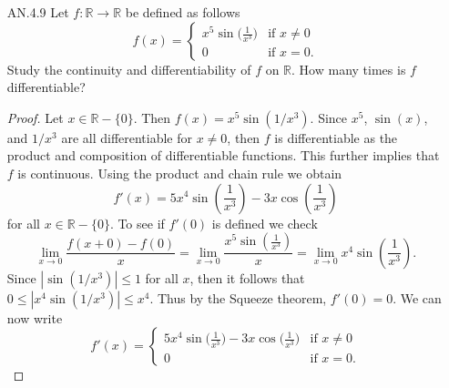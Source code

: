 \documentclass[12pt]{article}
\begin{document}
\begin{enumerate}
\begin{enumerate}[(a)]
\begin{proof}
                        Thus $y\mid x$. Therefore $x=y$. 
                    \end{proof}
            \end{enumerate}
        \item[AN.4.9] Let $f:\mathbb{R}\to\mathbb{R}$ be defined as follows
            \begin{equation*}
                f(x)=\begin{cases}
                    x^5\sin\big(\frac{1}{x^3}\big)&\text{if $x\neq 0$} \\
                    0&\text{if $x=0$}. 
                \end{cases}
            \end{equation*}
            Study the continuity and differentiability of $f$ on $\mathbb{R}$.
            How many times is $f$ differentiable?
            \begin{proof}
                Let $x\in\mathbb{R}-\{0\}$. Then $f(x)=x^5\sin(1/x^3)$. Since
                $x^5$, $\sin(x)$, and $1/x^3$ are all differentiable for $x\neq 0$,
                then $f$ is differentiable as the product and composition of
                differentiable functions. This further implies that $f$ is
                continuous. Using the product and chain rule we obtain
                \begin{equation*}
                    f'(x)=5x^4\sin(\frac{1}{x^3})-3x\cos(\frac{1}{x^3})
                \end{equation*}
                for all $x\in\mathbb{R}-\{0\}$. To see if $f'(0)$ is defined we
                check 
                \begin{equation*}
                    \lim_{x\to 0}\frac{f(x+0)-f(0)}{x}=\lim_{x\to
                    0}\frac{x^5\sin(\frac{1}{x^3})}{x}=\lim_{x\to
                    0}x^4\sin(\frac{1}{x^3}).
                \end{equation*}
                Since $|\sin(1/x^3)|\leq 1$ for all $x$, then it follows that
                $0\leq|x^4\sin(1/x^3)|\leq x^4$. Thus by the Squeeze theorem,
                $f'(0)=0$. We can now write 
                \begin{equation*}
                    f'(x)=\begin{cases}
                        5x^4\sin\big(\frac{1}{x^3}\big)-3x\cos\big(\frac{1}{x^3}\big)&\text{if
                        $x\neq 0$} \\
                        0&\text{if $x=0$}.
                    \end{cases}

\end{equation*}
\end{proof}
\end{enumerate}
\end{document}
